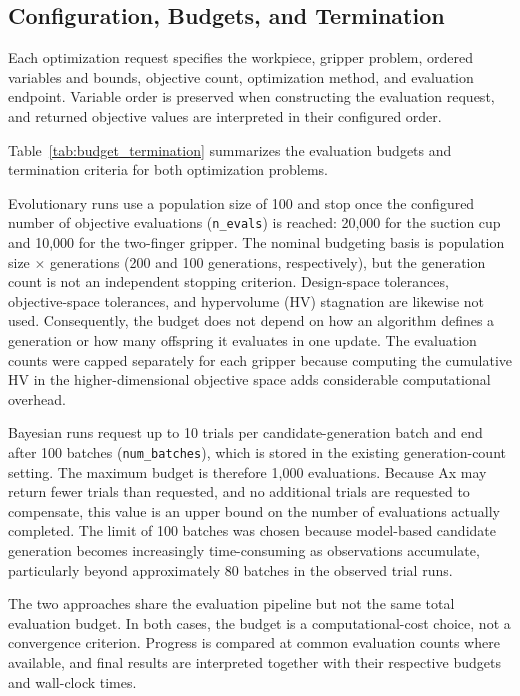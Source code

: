 \subsection{Configuration, Budgets, and Termination}
\label{sec:two_finger_termination}

Each optimization request specifies the workpiece, gripper problem, ordered
variables and bounds, objective count, optimization method, and evaluation
endpoint. Variable order is preserved when constructing the evaluation
request, and returned objective values are interpreted in their configured
order.

Table~\ref{tab:budget_termination} summarizes the evaluation budgets and
termination criteria for both optimization problems.

Evolutionary runs use a population size of 100 and stop
once the configured number of objective evaluations (\texttt{n\_evals}) is
reached: 20,000 for the suction cup and 10,000 for the two-finger gripper.
The nominal budgeting basis is population size $\times$ generations (200 and
100 generations, respectively), but the generation count is not an
independent stopping criterion. Design-space tolerances, objective-space
tolerances, and hypervolume (HV) stagnation are likewise not used.
Consequently, the budget does not depend on how an algorithm defines a
generation or how many offspring it evaluates in one update. The evaluation
counts were capped separately for each gripper because computing the
cumulative HV in the higher-dimensional objective space adds considerable
computational overhead.

Bayesian runs request up to 10 trials per
candidate-generation batch and end after 100 batches (\texttt{num\_batches}),
which is stored in the existing generation-count setting. The maximum budget
is therefore 1,000 evaluations. Because Ax may return fewer trials than
requested, and no additional trials are requested to compensate, this value is
an upper bound on the number of evaluations actually completed. The limit of
100 batches was chosen because model-based candidate generation becomes
increasingly time-consuming as observations accumulate, particularly beyond
approximately 80 batches in the observed trial runs.

The two approaches share the evaluation pipeline but not the same total
evaluation budget. In both cases, the budget is a computational-cost choice,
not a convergence criterion. Progress is compared at common evaluation counts
where available, and final results are interpreted together with their
respective budgets and wall-clock times.

